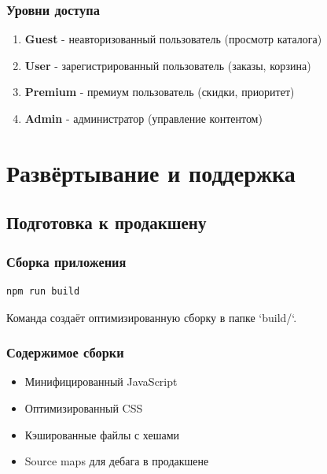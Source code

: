 \documentclass[12pt,a4paper]{report}
\begin{document}
\subsection{Уровни доступа}
\begin{enumerate}
    \item \textbf{Guest} - неавторизованный пользователь (просмотр каталога)
    \item \textbf{User} - зарегистрированный пользователь (заказы, корзина)
    \item \textbf{Premium} - премиум пользователь (скидки, приоритет)
    \item \textbf{Admin} - администратор (управление контентом)
\end{enumerate}

\newpage

\chapter{Развёртывание и поддержка}

\section{Подготовка к продакшену}

\subsection{Сборка приложения}
\begin{lstlisting}
npm run build
\end{lstlisting}

Команда создаёт оптимизированную сборку в папке `build/`.

\subsection{Содержимое сборки}
\begin{itemize}
    \item Минифицированный JavaScript
    \item Оптимизированный CSS
    \item Кэшированные файлы с хешами
    \item Source maps для дебага в продакшене
\end{itemize}
\end{document}
